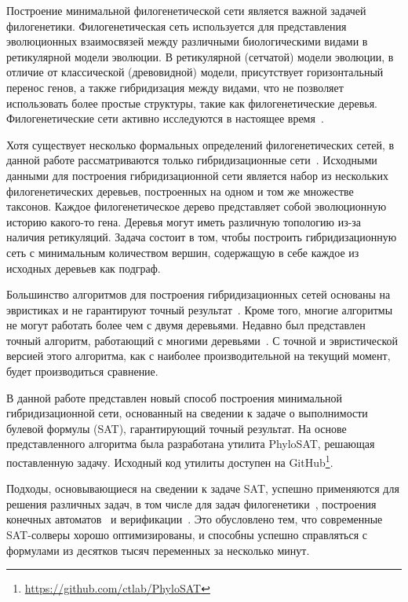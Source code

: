 \startprefacepage

Построение минимальной филогенетической сети является важной задачей филогенетики.
Филогенетическая сеть используется для представления эволюционных взаимосвязей между различными биологическими видами в ретикулярной модели эволюции.
В ретикулярной (сетчатой) модели эволюции, в отличие от классической (древовидной) модели, присутствует горизонтальный перенос генов, а также гибридизация между видами, что не позволяет использовать более простые структуры, такие как филогенетические деревья.
Филогенетические сети активно исследуются в настоящее время~\cite{huson2010phylogenetic, morrison2011introduction, 
nakhleh2011evolutionary}.

Хотя существует несколько формальных определений филогенетических сетей, в данной работе рассматриваются только гибридизационные сети~\cite{semple2006hybridization, chen2010hybridnet}.
Исходными данными для построения гибридизационной сети является набор из нескольких филогенетических деревьев, построенных на одном и том же множестве таксонов.
Каждое филогенетическое дерево представляет собой эволюционную историю какого-то гена.
Деревья могут иметь различную топологию из-за наличия ретикуляций.
Задача состоит в том, чтобы построить гибридизационную сеть с минимальным количеством вершин, содержащую в себе каждое из исходных деревьев как подграф.

Большинство алгоритмов для построения гибридизационных сетей основаны на эвристиках и не гарантируют точный результат~\cite{wu2010close, park2012murpar}.
Кроме того, многие алгоритмы не могут работать более чем с двумя деревьями.
Недавно был представлен точный алгоритм, работающий с многими деревьями~\cite{wu2013algorithm}.
С точной и эвристической версией этого алгоритма, как с наиболее производительной на текущий момент, будет производиться сравнение.

В данной работе представлен новый способ построения минимальной гибридизационной сети, основанный на сведении к задаче о выполнимости булевой формулы (SAT), гарантирующий точный результат.
На основе представленного алгоритма была разработана утилита PhyloSAT, решающая поставленную задачу. Исходный код утилиты доступен на GitHub\footnote{\url{https://github.com/ctlab/PhyloSAT}}.

Подходы, основывающиеся на сведении к задаче SAT, успешно применяются для решения различных задач, в том числе для задач филогенетики~\cite{bonet2009efficiently}, построения конечных автоматов~\cite{heule2010exact} и верификации~\cite{biere2003bounded}.
Это обусловлено тем, что современные SAT-солверы хорошо оптимизированы, и способны успешно справляться с формулами из десятков тысяч переменных за несколько минут.
